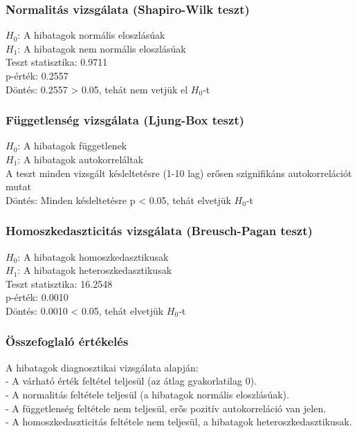\documentclass[11pt]{article}
\begin{document}
\subsubsection{Normalitás vizsgálata (Shapiro-Wilk
teszt)}\label{normalituxe1s-vizsguxe1lata-shapiro-wilk-teszt}

$H_0$: A hibatagok normális eloszlásúak\\
$H_1$: A hibatagok nem normális eloszlásúak\\
Teszt statisztika: 0.9711\\
p-érték: 0.2557\\
Döntés: 0.2557 \textgreater{} 0.05, tehát nem vetjük el $H_0$-t

\subsubsection{Függetlenség vizsgálata (Ljung-Box
teszt)}\label{fuxfcggetlensuxe9g-vizsguxe1lata-ljung-box-teszt}

$H_0$: A hibatagok függetlenek\\
$H_1$: A hibatagok autokorreláltak\\
A teszt minden vizsgált késleltetésre (1-10 lag) erősen szignifikáns
autokorrelációt mutat\\
Döntés: Minden késleltetésre p \textless{} 0.05, tehát elvetjük $H_0$-t

\subsubsection{Homoszkedaszticitás vizsgálata (Breusch-Pagan
teszt)}\label{homoszkedaszticituxe1s-vizsguxe1lata-breusch-pagan-teszt}

$H_0$: A hibatagok homoszkedasztikusak\\
$H_1$: A hibatagok heteroszkedasztikusak\\
Teszt statisztika: 16.2548\\
p-érték: 0.0010\\
Döntés: 0.0010 \textless{} 0.05, tehát elvetjük $H_0$-t

\subsubsection{Összefoglaló
értékelés}\label{uxf6sszefoglaluxf3-uxe9rtuxe9keluxe9s}

A hibatagok diagnosztikai vizsgálata alapján:\\
- A várható érték feltétel teljesül (az átlag gyakorlatilag 0).\\
- A normalitás feltétele teljesül (a hibatagok normális eloszlásúak).\\
- A függetlenség feltétele nem teljesül, erős pozitív autokorreláció van
jelen.\\
- A homoszkedaszticitás feltétele nem teljesül, a hibatagok
heteroszkedasztikusak.
\end{document}
